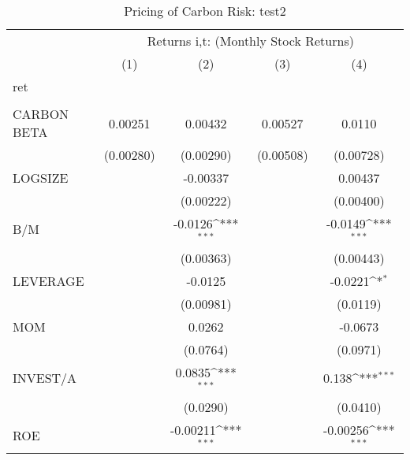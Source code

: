\begin{table}[htbp]\centering
\def\sym#1{\ifmmode^{#1}\else\(^{#1}\)\fi}
\caption{Pricing of Carbon Risk: test2}
\begin{tabular}{l*{4}{c}}
\hline\hline
                &\multicolumn{4}{c}{Returns i,t: (Monthly Stock Returns) }                  \\\cmidrule(lr){2-5}
                &\multicolumn{1}{c}{(1)}         &\multicolumn{1}{c}{(2)}         &\multicolumn{1}{c}{(3)}         &\multicolumn{1}{c}{(4)}         \\
\hline
ret             &                  &                  &                  &                  \\
                &                  &                  &                  &                  \\
CARBON BETA     &  0.00251         &  0.00432         &  0.00527         &   0.0110         \\
                &(0.00280)         &(0.00290)         &(0.00508)         &(0.00728)         \\
LOGSIZE         &                  & -0.00337         &                  &  0.00437         \\
                &                  &(0.00222)         &                  &(0.00400)         \\
B/M             &                  &  -0.0126\sym{***}&                  &  -0.0149\sym{***}\\
                &                  &(0.00363)         &                  &(0.00443)         \\
LEVERAGE        &                  &  -0.0125         &                  &  -0.0221\sym{*}  \\
                &                  &(0.00981)         &                  & (0.0119)         \\
MOM             &                  &   0.0262         &                  &  -0.0673         \\
                &                  & (0.0764)         &                  & (0.0971)         \\
INVEST/A        &                  &   0.0835\sym{***}&                  &    0.138\sym{***}\\
                &                  & (0.0290)         &                  & (0.0410)         \\
ROE             &                  & -0.00211\sym{***}&                  & -0.00256\sym{***}\\

\end{tabular}
\end{table}
